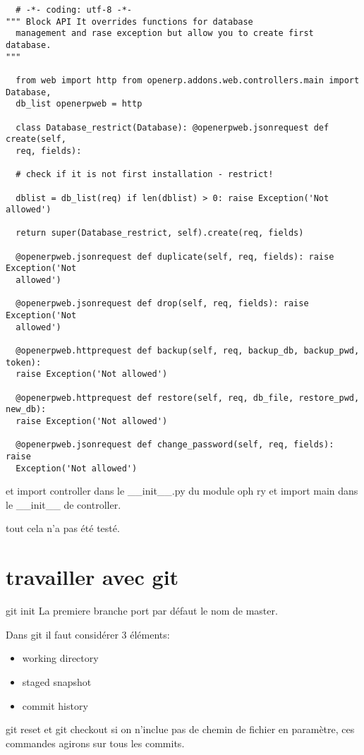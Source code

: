\documentclass[12pt,a4paper]{article}
\begin{document}
\begin{verbatim}
  # -*- coding: utf-8 -*- 
""" Block API It overrides functions for database
  management and rase exception but allow you to create first database.  
"""

  from web import http from openerp.addons.web.controllers.main import Database,
  db_list openerpweb = http

  class Database_restrict(Database): @openerpweb.jsonrequest def create(self,
  req, fields):

  # check if it is not first installation - restrict!

  dblist = db_list(req) if len(dblist) > 0: raise Exception('Not allowed')

  return super(Database_restrict, self).create(req, fields)

  @openerpweb.jsonrequest def duplicate(self, req, fields): raise Exception('Not
  allowed')

  @openerpweb.jsonrequest def drop(self, req, fields): raise Exception('Not
  allowed')

  @openerpweb.httprequest def backup(self, req, backup_db, backup_pwd, token):
  raise Exception('Not allowed')

  @openerpweb.httprequest def restore(self, req, db_file, restore_pwd, new_db):
  raise Exception('Not allowed')

  @openerpweb.jsonrequest def change_password(self, req, fields): raise
  Exception('Not allowed')
\end{verbatim}

et import controller dans le \_\_init\_\_.py du module oph ry 
et import main dans le \_\_init\_\_ de controller.

tout cela n'a pas été testé.

\section{travailler avec git}

git init
La premiere branche port par défaut le nom de master.



Dans git il faut considérer 3 éléments:
\begin{itemize}
\item working directory
\item staged snapshot
\item commit history
\end{itemize}

git reset et git checkout si on n'inclue pas de chemin de fichier en paramètre, ces commandes agirons sur tous les commits.
\end{document}
